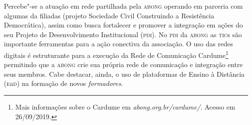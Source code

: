


Percebe"-se a atuação em rede partilhada pela \textsc{abong}
operando em parceria com algumas da filiadas (projeto Sociedade Civil
Construindo a Resistência Democrática), assim como busca fortalecer e
promover a integração em ações do seu Projeto de Desenvolvimento
Institucional (\textsc{pdi}). No \textsc{pdi} da \textsc{abong} as \textsc{tic}s são importante ferramentas
para a ação conectiva da associação. O uso das redes digitais é
estruturante para a execução da Rede de Comunicação Cardume\footnote{Mais
  informações sobre o Cardume em
  \textit{abong.org.br/cardume/}. Acesso em 26/09/2019.} permitindo que a \textsc{abong} crie sua própria rede de
comunicação e integração entre seus membros. Cabe destacar, ainda, o uso
de plataformas de Ensino à Distância (\textsc{e}a\textsc{d}) na formação de novos
\textit{formadores}.

